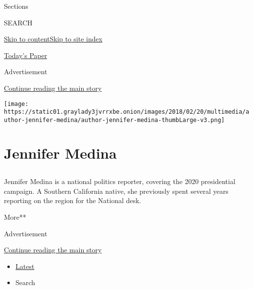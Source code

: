 Sections

SEARCH

\protect\hyperlink{site-content}{Skip to
content}\protect\hyperlink{site-index}{Skip to site index}

\href{https://myaccount.nytimes3xbfgragh.onion/auth/login?response_type=cookie\&client_id=vi}{}

\href{https://www.nytimes3xbfgragh.onion/section/todayspaper}{Today's
Paper}

Advertisement

\protect\hyperlink{after-top}{Continue reading the main story}

\texttt{[image: https://static01.graylady3jvrrxbe.onion/images/2018/02/20/multimedia/author-jennifer-medina/author-jennifer-medina-thumbLarge-v3.png]}

\hypertarget{jennifer-medina}{%
\section{Jennifer Medina}\label{jennifer-medina}}

\subsection{}

Jennifer Medina is a national politics reporter, covering the 2020
presidential campaign. A Southern California native, she previously
spent several years reporting on the region for the National desk.

More**

Advertisement

\protect\hyperlink{after-mid1}{Continue reading the main story}

\begin{itemize}
\tightlist
\item
  \protect\hyperlink{stream-panel}{Latest}
\item
  Search
\end{itemize}

